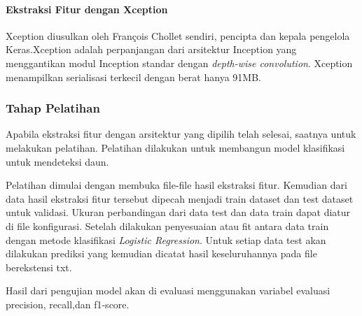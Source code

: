 \paragraph{Ekstraksi Fitur dengan Xception}
\mbox{}
\par Xception diusulkan oleh François Chollet sendiri, pencipta dan kepala pengelola Keras.Xception adalah perpanjangan dari arsitektur Inception yang menggantikan modul Inception standar dengan \textit{depth-wise convolution}. Xception menampilkan serialisasi terkecil dengan berat hanya 91MB.

\subsubsection{Tahap Pelatihan}
\par Apabila ekstraksi fitur dengan arsitektur yang dipilih telah selesai, saatnya untuk melakukan pelatihan. Pelatihan dilakukan untuk membangun model klasifikasi untuk mendeteksi daun. 
\par Pelatihan dimulai dengan membuka file-file hasil ekstraksi fitur. Kemudian dari data hasil ekstraksi fitur tersebut dipecah menjadi train dataset dan test dataset untuk validasi. Ukuran perbandingan dari data test dan data train dapat diatur di file konfigurasi. Setelah dilakukan penyesuaian atau fit antara data train dengan metode klasifikasi \textit{Logistic Regression}. Untuk setiap data test akan dilakukan prediksi yang kemudian dicatat hasil keseluruhannya pada file berekstensi txt.
\par Hasil dari pengujian model akan di evaluasi menggunakan variabel evaluasi precision, recall,dan f1-score. 


